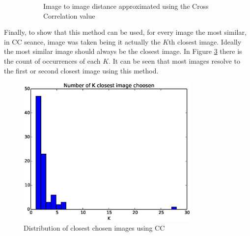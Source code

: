 \begin{figure}
\begin{subfigure}[b]{0.60\linewidth}
         \caption{Image to image distance approximated using the Cross Correlation value}                
         \label{fig:CC_confusion_matrix}
  \end{subfigure}
  \caption{}
\end{figure}


Finally, to show that this method can be used, for every image the most similar, in CC seance, image was taken being it actually the  $K$th closest image. Ideally the most similar image should always be the closest image. In Figure \ref{fig:K_closest} there is the count of occurrences of each $K$. It can be seen that most images resolve to the first or second closest image using this method.\\

\begin{figure}[!htbp]
  \centering
  \includegraphics[width=9cm]{img/demo_1_1_CC_choose_distribution.eps}
  \caption{Distribution of closest chosen images using CC}
  \label{fig:K_closest}
\end{figure}


